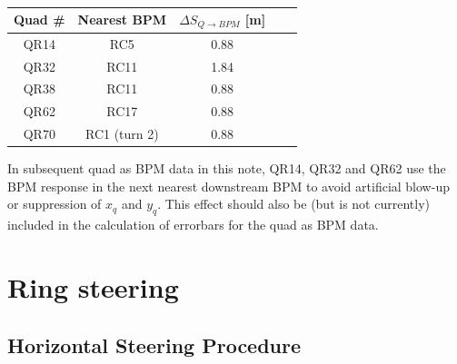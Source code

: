 \begin{table}
\centering
\caption{}
\label{tab:nulls}
\begin{tabular}{|c|c|c|c|c|}
Quad \# & Nearest BPM & $\Delta S_{Q \rightarrow BPM}$ [m] \\
\hline
QR14 & RC5 & 0.88   \\
QR32 & RC11 & 1.84 \\
QR38 & RC11 & 0.88 \\
QR62 & RC17 & 0.88  \\
QR70 & RC1 (turn 2) & 0.88  \\
\end{tabular}
\end{table}





In subsequent quad as BPM data in this note, QR14, QR32 and QR62 use the BPM response in the next nearest downstream BPM to avoid artificial blow-up or suppression of $x_q$ and $y_q$. 
This effect should also be (but is not currently) included in the calculation of errorbars for the quad as BPM data.












\section{Ring steering} \label{sec:steering:ringsteering}




\subsection{Horizontal Steering Procedure}

